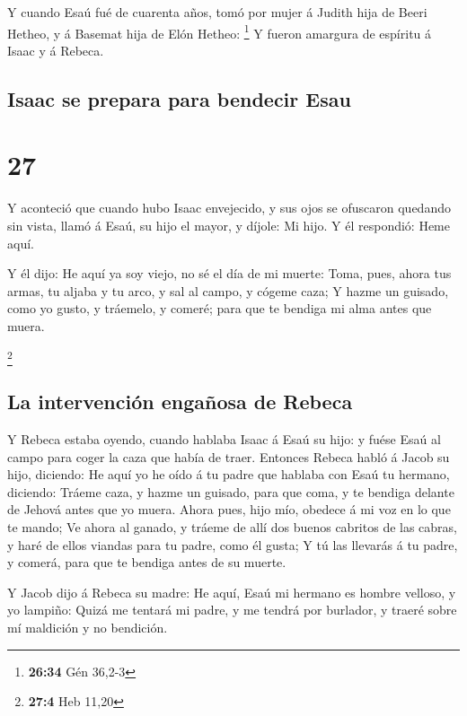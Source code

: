  Y cuando Esaú fué de cuarenta años, tomó por mujer á
Judith hija de Beeri Hetheo, y á Basemat hija de Elón Hetheo:
\footnote{\textbf{26:34} Gén 36,2-3}  Y fueron amargura de
espíritu á Isaac y á Rebeca.

\hypertarget{isaac-se-prepara-para-bendecir-esau}{%
\subsection{Isaac se prepara para bendecir
Esau}\label{isaac-se-prepara-para-bendecir-esau}}

\hypertarget{section-26}{%
\section{27}\label{section-26}}

 Y aconteció que cuando hubo Isaac envejecido, y sus ojos se
ofuscaron quedando sin vista, llamó á Esaú, su hijo el mayor, y díjole:
Mi hijo. Y él respondió: Heme aquí.

 Y él dijo: He aquí ya soy viejo, no sé el día de mi muerte:
 Toma, pues, ahora tus armas, tu aljaba y tu arco, y sal al
campo, y cógeme caza;  Y hazme un guisado, como yo gusto, y
tráemelo, y comeré; para que te bendiga mi alma antes que muera.

\footnote{\textbf{27:4} Heb 11,20}

\hypertarget{la-intervenciuxf3n-engauxf1osa-de-rebeca}{%
\subsection{La intervención engañosa de
Rebeca}\label{la-intervenciuxf3n-engauxf1osa-de-rebeca}}

 Y Rebeca estaba oyendo, cuando hablaba Isaac á Esaú su
hijo: y fuése Esaú al campo para coger la caza que había de traer.
 Entonces Rebeca habló á Jacob su hijo, diciendo: He aquí yo
he oído á tu padre que hablaba con Esaú tu hermano, diciendo:
 Tráeme caza, y hazme un guisado, para que coma, y te
bendiga delante de Jehová antes que yo muera.  Ahora pues,
hijo mío, obedece á mi voz en lo que te mando;  Ve ahora al
ganado, y tráeme de allí dos buenos cabritos de las cabras, y haré de
ellos viandas para tu padre, como él gusta;  Y tú las
llevarás á tu padre, y comerá, para que te bendiga antes de su muerte.

 Y Jacob dijo á Rebeca su madre: He aquí, Esaú mi hermano
es hombre velloso, y yo lampiño:  Quizá me tentará mi
padre, y me tendrá por burlador, y traeré sobre mí maldición y no
bendición.

